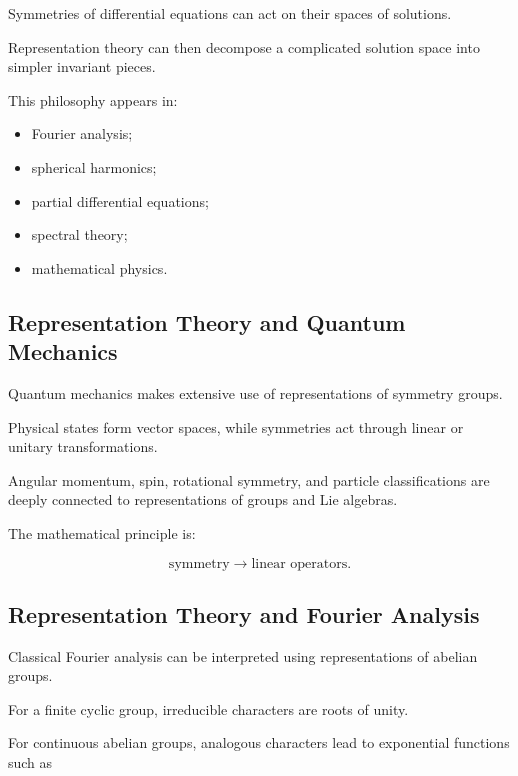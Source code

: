 Symmetries of differential equations can act on their spaces of solutions.

Representation theory can then decompose a complicated solution space into
simpler invariant pieces.

This philosophy appears in:

\begin{itemize}
    \item Fourier analysis;
    \item spherical harmonics;
    \item partial differential equations;
    \item spectral theory;
    \item mathematical physics.
\end{itemize}

\subsection{Representation Theory and Quantum Mechanics}
\label{subsec:representation-quantum}

Quantum mechanics makes extensive use of representations of symmetry groups.

Physical states form vector spaces, while symmetries act through linear or
unitary transformations.

Angular momentum, spin, rotational symmetry, and particle classifications
are deeply connected to representations of groups and Lie algebras.

The mathematical principle is:

\[ \text{symmetry}\longrightarrow\text{linear operators}. \]

\subsection{Representation Theory and Fourier Analysis}
\label{subsec:representation-fourier}

Classical Fourier analysis can be interpreted using representations of
abelian groups.

For a finite cyclic group, irreducible characters are roots of unity.

For continuous abelian groups, analogous characters lead to exponential
functions such as

